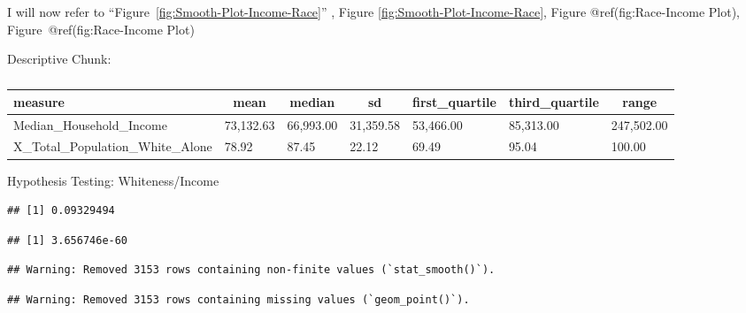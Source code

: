 \documentclass[
  man]{apa6}
\begin{document}
I will now refer to ``Figure~\ref{fig:Smooth-Plot-Income-Race}'' , Figure \ref{fig:Smooth-Plot-Income-Race}, Figure @ref(fig:Race-Income Plot), Figure~@ref(fig:Race-Income Plot)

Descriptive Chunk:

\begin{table}[tbp]

\begin{center}
\begin{threeparttable}

\caption{\label{tab:unnamed-chunk-2}}

\begin{tabular}{lllllll}
\toprule
measure & \multicolumn{1}{c}{mean} & \multicolumn{1}{c}{median} & \multicolumn{1}{c}{sd} & \multicolumn{1}{c}{first\_quartile} & \multicolumn{1}{c}{third\_quartile} & \multicolumn{1}{c}{range}\\
\midrule
Median\_Household\_Income & 73,132.63 & 66,993.00 & 31,359.58 & 53,466.00 & 85,313.00 & 247,502.00\\
X\_Total\_Population\_White\_Alone & 78.92 & 87.45 & 22.12 & 69.49 & 95.04 & 100.00\\
\bottomrule
\end{tabular}

\end{threeparttable}
\end{center}

\end{table}

Hypothesis Testing: Whiteness/Income

\begin{verbatim}
## [1] 0.09329494
\end{verbatim}

\begin{verbatim}
## [1] 3.656746e-60
\end{verbatim}

\begin{verbatim}
## Warning: Removed 3153 rows containing non-finite values (`stat_smooth()`).
\end{verbatim}

\begin{verbatim}
## Warning: Removed 3153 rows containing missing values (`geom_point()`).
\end{verbatim}
\end{document}
